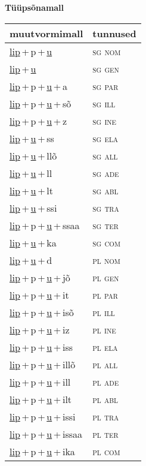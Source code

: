 
\vspace{1.8em}
\begin{minipage}{\textwidth}
\textbf{Tüüpsõnamall \,}\\

\begin{sideways}
\begin{tabular}{l l}
muutvormimall & tunnused \\
\hline
\underline{lip}\,+\,p\,+\,\underline{u} & \textsc{ sg nom } \\
\underline{lip}\,+\,\underline{u} & \textsc{ sg gen } \\
\underline{lip}\,+\,p\,+\,\underline{u}\,+\,a & \textsc{ sg par } \\
\underline{lip}\,+\,p\,+\,\underline{u}\,+\,sõ & \textsc{ sg ill } \\
\underline{lip}\,+\,p\,+\,\underline{u}\,+\,z & \textsc{ sg ine } \\
\underline{lip}\,+\,\underline{u}\,+\,ss & \textsc{ sg ela } \\
\underline{lip}\,+\,\underline{u}\,+\,llõ & \textsc{ sg all } \\
\underline{lip}\,+\,\underline{u}\,+\,ll & \textsc{ sg ade } \\
\underline{lip}\,+\,\underline{u}\,+\,lt & \textsc{ sg abl } \\
\underline{lip}\,+\,\underline{u}\,+\,ssi & \textsc{ sg tra } \\
\underline{lip}\,+\,p\,+\,\underline{u}\,+\,ssaa & \textsc{ sg ter } \\
\underline{lip}\,+\,\underline{u}\,+\,ka & \textsc{ sg com } \\
\underline{lip}\,+\,\underline{u}\,+\,d & \textsc{ pl nom } \\
\underline{lip}\,+\,p\,+\,\underline{u}\,+\,jõ & \textsc{ pl gen } \\
\underline{lip}\,+\,p\,+\,\underline{u}\,+\,it & \textsc{ pl par } \\
\underline{lip}\,+\,p\,+\,\underline{u}\,+\,isõ & \textsc{ pl ill } \\
\underline{lip}\,+\,p\,+\,\underline{u}\,+\,iz & \textsc{ pl ine } \\
\underline{lip}\,+\,p\,+\,\underline{u}\,+\,iss & \textsc{ pl ela } \\
\underline{lip}\,+\,p\,+\,\underline{u}\,+\,illõ & \textsc{ pl all } \\
\underline{lip}\,+\,p\,+\,\underline{u}\,+\,ill & \textsc{ pl ade } \\
\underline{lip}\,+\,p\,+\,\underline{u}\,+\,ilt & \textsc{ pl abl } \\
\underline{lip}\,+\,p\,+\,\underline{u}\,+\,issi & \textsc{ pl tra } \\
\underline{lip}\,+\,p\,+\,\underline{u}\,+\,issaa & \textsc{ pl ter } \\
\underline{lip}\,+\,p\,+\,\underline{u}\,+\,ika & \textsc{ pl com } \\
\end{tabular}
\end{sideways}
\label{tab:tüüpsõnamall-lippu}


\end{minipage}
